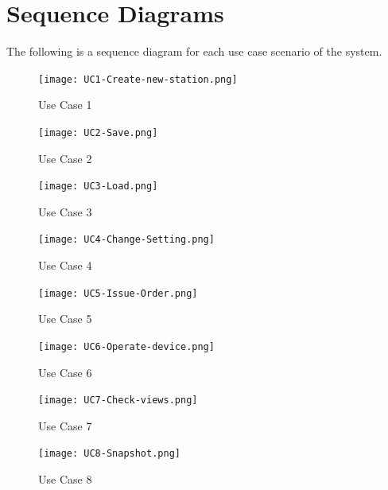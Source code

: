 \documentclass[]{article}
\begin{document}
\section{Sequence Diagrams}
\label{sec:sequence_diagrams}
The following is a sequence diagram for each use case scenario of the system.
\begin{figure}[H]
	\centering
	\texttt{[image: UC1-Create-new-station.png]}
	\caption{Use Case 1}
\end{figure}
\begin{figure}[H]
	\centering
	\texttt{[image: UC2-Save.png]}
	\caption{Use Case 2}
\end{figure}
\begin{figure}[H]
	\centering
	\texttt{[image: UC3-Load.png]}
	\caption{Use Case 3}
\end{figure}
\begin{figure}[H]
	\centering
	\texttt{[image: UC4-Change-Setting.png]}
	\caption{Use Case 4}
\end{figure}
\begin{figure}[H]
	\centering
	\texttt{[image: UC5-Issue-Order.png]}
	\caption{Use Case 5}
\end{figure}
\begin{figure}[H]
	\centering
	\texttt{[image: UC6-Operate-device.png]}
	\caption{Use Case 6}
\end{figure}
\begin{figure}[H]
	\centering
	\texttt{[image: UC7-Check-views.png]}
	\caption{Use Case 7}
\end{figure}
\begin{figure}[H]
	\centering
	\texttt{[image: UC8-Snapshot.png]}
	\caption{Use Case 8}
\end{figure}
\end{document}
